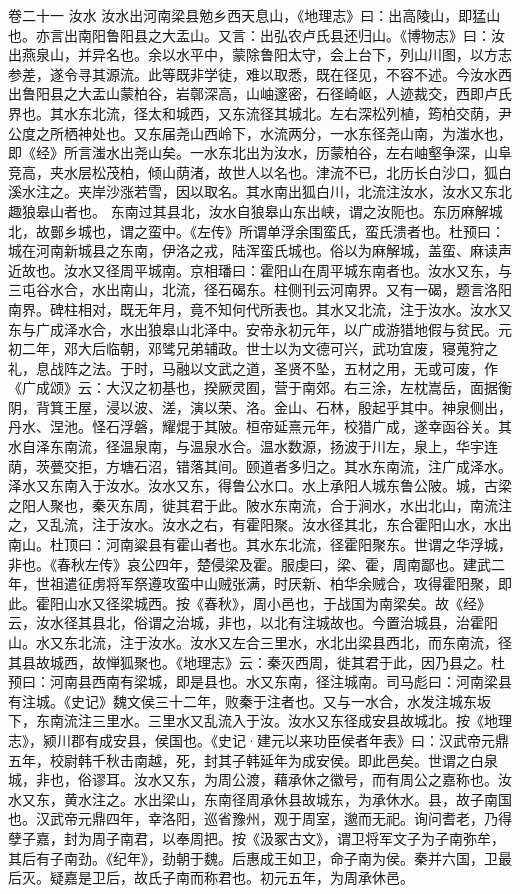\documentclass[12pt,UTF8]{ctexbook}
\begin{document}
卷二十一  汝水 
汝水出河南梁县勉乡西天息山，《地理志》曰：出高陵山，即猛山也。亦言出南阳鲁阳县之大盂山。又言：出弘农卢氏县还归山。《博物志》曰：汝出燕泉山，并异名也。余以水平中，蒙除鲁阳太守，会上台下，列山川图，以方志参差，遂令寻其源流。此等既非学徒，难以取悉，既在径见，不容不述。今汝水西出鲁阳县之大盂山蒙柏谷，岩鄣深高，山岫邃密，石径崎岖，人迹裁交，西即卢氏界也。其水东北流，径太和城西，又东流径其城北。左右深松列植，筠柏交荫，尹公度之所栖神处也。又东届尧山西岭下，水流两分，一水东径尧山南，为滍水也，即《经》所言滍水出尧山矣。一水东北出为汝水，历蒙柏谷，左右岫壑争深，山阜竞高，夹水层松茂柏，倾山荫渚，故世人以名也。津流不已，北历长白沙口，狐白溪水注之。夹岸沙涨若雪，因以取名。其水南出狐白川，北流注汝水，汝水又东北趣狼皋山者也。
东南过其县北，汝水自狼皋山东出峡，谓之汝阨也。东历麻解城北，故鄤乡城也，谓之蛮中。《左传》所谓单浮余围蛮氏，蛮氏溃者也。杜预曰：城在河南新城县之东南，伊洛之戎，陆浑蛮氏城也。俗以为麻解城，盖蛮、麻读声近故也。汝水又径周平城南。京相璠曰：霍阳山在周平城东南者也。汝水又东，与三屯谷水合，水出南山，北流，径石碣东。柱侧刊云河南界。又有一碣，题言洛阳南界。碑柱相对，既无年月，竟不知何代所表也。其水又北流，注于汝水。汝水又东与广成泽水合，水出狼皋山北泽中。安帝永初元年，以广成游猎地假与贫民。元初二年，邓大后临朝，邓骘兄弟辅政。世士以为文德可兴，武功宜废，寝蒐狩之礼，息战阵之法。于时，马融以文武之道，圣贤不坠，五材之用，无或可废，作《广成颂》云：大汉之初基也，揆厥灵囿，营于南郊。右三涂，左枕嵩岳，面据衡阴，背箕王屋，浸以波、溠，演以荣、洛。金山、石林，殷起乎其中。神泉侧出，丹水、涅池。怪石浮磐，耀焜于其陂。桓帝延熹元年，校猎广成，遂幸函谷关。其水自泽东南流，径温泉南，与温泉水合。温水数源，扬波于川左，泉上，华宇连荫，茨甍交拒，方塘石沼，错落其间。颐道者多归之。其水东南流，注广成泽水。泽水又东南入于汝水。汝水又东，得鲁公水口。水上承阳人城东鲁公陂。城，古梁之阳人聚也，秦灭东周，徙其君于此。陂水东南流，合于涧水，水出北山，南流注之，又乱流，注于汝水。汝水之右，有霍阳聚。汝水径其北，东合霍阳山水，水出南山。杜顶曰：河南粱县有霍山者也。其水东北流，径霍阳聚东。世谓之华浮城，非也。《春秋左传》哀公四年，楚侵梁及霍。服虔曰，梁、霍，周南鄙也。建武二年，世祖遣征虏将军祭遵攻蛮中山贼张满，时厌新、柏华余贼合，攻得霍阳聚，即此。霍阳山水又径梁城西。按《春秋》，周小邑也，于战国为南梁矣。故《经》云，汝水径其县北，俗谓之治城，非也，以北有注城故也。今置治城县，治霍阳山。水又东北流，注于汝水。汝水又左合三里水，水北出梁县西北，而东南流，径其县故城西，故惮狐聚也。《地理志》云：秦灭西周，徙其君于此，因乃县之。杜预曰：河南县西南有梁城，即是县也。水又东南，径注城南。司马彪曰：河南梁县有注城。《史记》魏文侯三十二年，败秦于注者也。又与一水合，水发注城东坂下，东南流注三里水。三里水又乱流入于汝。汝水又东径成安县故城北。按《地理志》，颍川郡有成安县，侯国也。《史记·建元以来功臣侯者年表》曰：汉武帝元鼎五年，校尉韩千秋击南越，死，封其子韩延年为成安侯。即此邑矣。世谓之白泉城，非也，俗谬耳。汝水又东，为周公渡，藉承休之徽号，而有周公之嘉称也。汝水又东，黄水注之。水出梁山，东南径周承休县故城东，为承休水。县，故子南国也。汉武帝元鼎四年，幸洛阳，巡省豫州，观于周室，邈而无祀。询问耆老，乃得孽子嘉，封为周子南君，以奉周把。按《汲冢古文》，谓卫将军文子为子南弥牟，其后有子南劲。《纪年》，劲朝于魏。后惠成王如卫，命子南为侯。秦并六国，卫最后灭。疑嘉是卫后，故氏子南而称君也。初元五年，为周承休邑。
\end{document}
